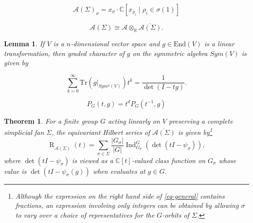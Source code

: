 \documentclass[10pt,a4paper]{amsart}
\newtheorem{theorem}{Theorem}
\newtheorem{lemma}{Lemma}
\begin{document}
\begin{equation} \label{eq-summand of SR}
\mathcal{A}(\Sigma)_\sigma=x_\sigma \cdot \mathbb{C}[x_{\rho_i} \mid \rho_i \in \sigma(1)]
\end{equation}

\begin{equation} \label{eq-Giso}
  \mathcal{A}(\Sigma)\cong \mathcal{A}\otimes_{\mathbb{R}}\overline{\mathcal{A}(\Sigma)}.  
\end{equation}

\begin{lemma} \label{lem-sym}
If $V$ is a $n$-dimensional vector space and $g \in \text{End}(V)$ is a linear transformation, then graded character of $g$ on the symmetric algebra $Sym(V)$ is given by 

$$\sum_{k=0}^{\infty} \text{Tr}(g|_{Sym^k(V)}) t^k = \frac{1}{\det(I - tg)}.$$
\end{lemma}

\begin{equation} \label{eq-PD}
 P_G(t, g)=t^d P_G(t^{-1}, g)   
\end{equation}

\begin{theorem} \label{thm-main}
For a finite group $G$ acting linearly on $V$ preserving a complete simplicial fan $\Sigma$, the equivariant Hilbert series of $\overline{\mathcal{A}(\Sigma)}$ is given by\footnote{Although the expression on the right hand side of \eqref{eq-general} contains fractions, an expression involving only integers can be obtained by allowing $\sigma$ to vary over a choice of representatives for the $G$-orbits of $\Sigma$.}
\begin{equation} \label{eq-general}
   \operatorname{R}_{\overline{\mathcal{A}(\Sigma)}}(t)=\sum_{\sigma \in \Sigma} \frac{\left|G_{\sigma }\right|}{\left|G\right|} \operatorname{Ind}_{G_{\sigma}}^{G}\left(\operatorname{det}(tI-\psi_\sigma)\right),
\end{equation}
where $\operatorname{det}(tI-\psi_\sigma)$ is viewed as a $\mathbb{C}[t]$-valued class function on $G_{\sigma }$ whose value is $\operatorname{det}(tI-\psi_\sigma(g))$ when evaluates at $g \in G$.
\end{theorem}
\end{document}
